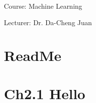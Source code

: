 \documentclass{article}
\begin{document}
\Large{Course: Machine Learning}

\Large{Lecturer: Dr. Da-Cheng Juan}
\section{ReadMe}
\label{ReadMe}

\section{Ch2.1 Hello}
\label{Ch2.1}

\end{document}
